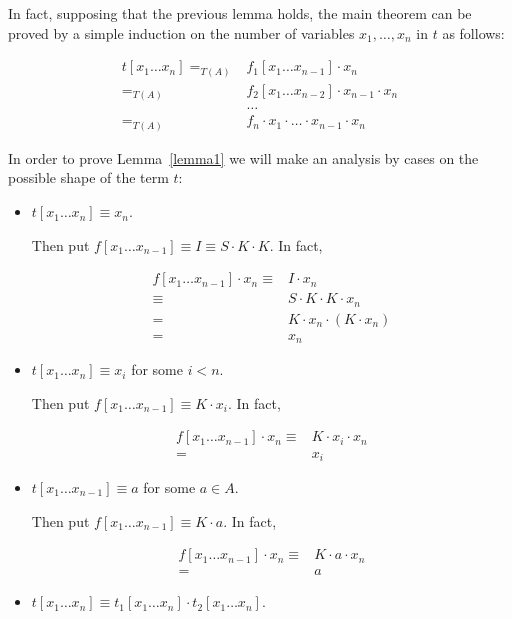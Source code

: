 \documentclass[a4paper,10pt]{article}
\begin{document}
In fact, supposing that the previous lemma holds, the main theorem can be
proved by a simple induction on the number of variables $x_1, \dots ,x_n$ in
$t$ as follows:

\begin{align*}
t[x_1 \dots x_n] =_{T(A)}& f_1[x_1 \dots x_{n-1}] \cdot x_n\\
=_{T(A)}& f_2[x_1 \dots x_{n-2}] \cdot x_{n-1} \cdot x_n\\
& \dots\\
=_{T(A)}& f_n \cdot x_1 \cdot \dots \cdot x_{n-1} \cdot x_n
\end{align*}

In order to prove Lemma~\ref{lemma1} we will make an analysis by cases on the
possible shape of the term $t$:

\begin{itemize}
 \item $t[x_1 \dots x_n] \equiv x_n$.

Then put $f[x_1 \dots x_{n-1}] \equiv I \equiv S \cdot K \cdot K$. In fact,

\begin{align*}
 f[x_1 \dots x_{n-1}] \cdot x_n \equiv & I \cdot x_n\\
\equiv & S \cdot K \cdot K \cdot x_n\\
= & K \cdot x_n \cdot (K \cdot x_n)\\
= & x_n
\end{align*}

\item $t[x_1 \dots x_n] \equiv x_i$ for some $i < n$.

Then put $f[x_1 \dots x_{n-1}] \equiv K \cdot x_i$. In fact,

\begin{align*}
f[x_1 \dots x_{n-1}] \cdot x_n \equiv & K \cdot x_i \cdot x_n\\
= & x_i
\end{align*}

\item $t[x_1 \dots x_{n-1}] \equiv a$ for some $a \in A$.

Then put $f[x_1 \dots x_{n-1}] \equiv K \cdot a$. In fact,

\begin{align*}
f[x_1 \dots x_{n-1}]\cdot x_n \equiv & K \cdot a \cdot x_n\\
= & a
\end{align*}

\item $t[x_1 \dots x_n] \equiv t_1 [x_1 \dots x_n] \cdot t_2 [x_1 \dots x_n]$.


\end{itemize}
\end{document}
